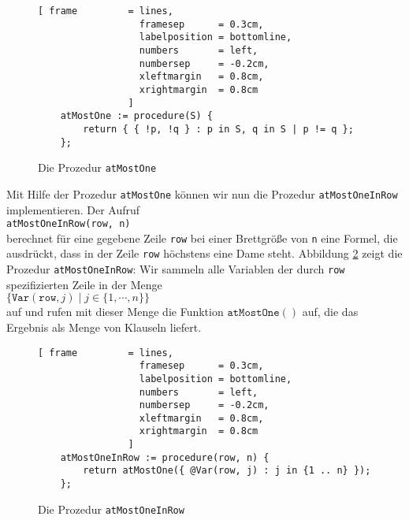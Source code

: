 \begin{figure}[!ht]
  \centering
\begin{Verbatim}[ frame         = lines, 
                  framesep      = 0.3cm, 
                  labelposition = bottomline,
                  numbers       = left,
                  numbersep     = -0.2cm,
                  xleftmargin   = 0.8cm,
                  xrightmargin  = 0.8cm
                ]
    atMostOne := procedure(S) {
        return { { !p, !q } : p in S, q in S | p != q };
    };
\end{Verbatim}
\vspace*{-0.3cm}
  \caption{Die Prozedur \texttt{atMostOne}}
  \label{fig:atMostOne}
\end{figure}

Mit Hilfe der Prozedur \texttt{atMostOne} können wir nun die Prozedur
\texttt{atMostOneInRow} implementieren.  Der Aufruf \\[0.2cm]
\hspace*{1.3cm} 
\texttt{atMostOneInRow(row, n)} \\[0.2cm]
berechnet für eine gegebene Zeile \texttt{row} bei einer Brettgröße von \texttt{n} eine Formel,
die ausdrückt, dass in der Zeile \texttt{row} höchstens eine Dame steht.
Abbildung \ref{fig:atMostOneInRow} zeigt die
Prozedur \texttt{atMostOneInRow}: Wir sammeln alle Variablen der durch \texttt{row}
spezifizierten Zeile
in der Menge 
\\[0.2cm]
\hspace*{1.3cm}
$\bigl\{ \texttt{Var}(\texttt{row},j) \mid j \in \{1, \cdots, n \} \bigr\}$
\\[0.2cm]
 auf und rufen mit dieser Menge die Funktion $\texttt{atMostOne}()$ auf, die das Ergebnis
als Menge von Klauseln liefert.

\begin{figure}[!ht]
  \centering
\begin{Verbatim}[ frame         = lines, 
                  framesep      = 0.3cm, 
                  labelposition = bottomline,
                  numbers       = left,
                  numbersep     = -0.2cm,
                  xleftmargin   = 0.8cm,
                  xrightmargin  = 0.8cm
                ]
    atMostOneInRow := procedure(row, n) {
        return atMostOne({ @Var(row, j) : j in {1 .. n} });
    };
\end{Verbatim}
\vspace*{-0.3cm}
  \caption{Die Prozedur \texttt{atMostOneInRow}}
  \label{fig:atMostOneInRow}
\end{figure}

